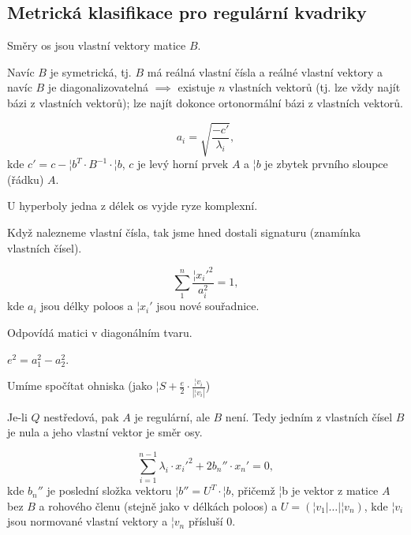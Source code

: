 \documentclass[12pt]{article}					%
\begin{document}

\subsection{Metrická klasifikace pro regulární kvadriky}
\begin{poznamka}
	Směry os jsou vlastní vektory matice $B$.

	Navíc $B$ je symetrická, tj. $B$ má reálná vlastní čísla a reálné vlastní vektory a navíc $B$ je diagonalizovatelná $\implies$ existuje $n$ vlastních vektorů (tj. lze vždy najít bázi z vlastních vektorů); lze najít dokonce ortonormální bázi z vlastních vektorů.
\end{poznamka}

\begin{definice}
	$$ a_i = \sqrt{\frac{-c'}{λ_i}}, $$
	kde $c' = c - ¦b^T·B^{-1}·¦b$, $c$ je levý horní prvek $A$ a $¦b$ je zbytek prvního sloupce (řádku) $A$.

	\begin{poznamkain}
		U hyperboly jedna z délek os vyjde ryze komplexní.
	\end{poznamkain}
\end{definice}

\begin{poznamka}
	Když nalezneme vlastní čísla, tak jsme hned dostali signaturu (znamínka vlastních čísel).
\end{poznamka}

\begin{definice}
	$$ \sum_1^n \frac{{¦x_i'}^2}{a_i^2} = 1, $$
	kde $a_i$ jsou délky poloos a $¦x_i'$ jsou nové souřadnice.

	\begin{dusledekin}
		Odpovídá matici v diagonálním tvaru.
	\end{dusledekin}
\end{definice}

\begin{tvrzeni}
	$e^2 = a_1^2 - a_2^2$.

	\begin{dusledek}
		Umíme spočítat ohniska (jako $¦S + \frac{e}{2}·\frac{¦v_i}{|¦v_i|}$)
	\end{dusledek}
\end{tvrzeni}

\begin{poznamka}[Nestředové]
	Je-li $Q$ nestředová, pak $A$ je regulární, ale $B$ není. Tedy jedním z vlastních čísel $B$ je nula a jeho vlastní vektor je směr osy.
\end{poznamka}


\begin{definice}
	$$ \sum_{i=1}^{n-1} λ_i·{x_i'}^2 + 2b_n''·x_n' = 0, $$
	kde $b_n''$ je poslední složka vektoru $¦b'' = U^T·¦b$, přičemž ¦b je vektor z matice $A$ bez $B$ a rohového členu (stejně jako v délkách poloos) a $U = (¦v_1 | … | ¦v_n)$, kde $¦v_i$ jsou normované vlastní vektory a $¦v_n$ přísluší 0.
\end{definice}
\end{document}
